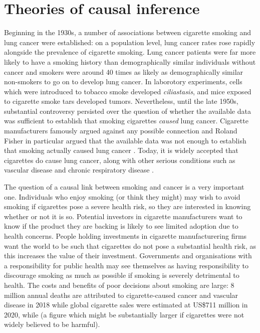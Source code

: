 

\section{Theories of causal inference}


Beginning in the 1930s, a number of associations between cigarette smoking and lung cancer were established: on a population level, lung cancer rates rose rapidly alongside the prevalence of cigarette smoking. Lung cancer patients were far more likely to have a smoking history than demographically similar individuals without cancer and smokers were around 40 times as likely as demographically similar non-smokers to go on to develop lung cancer. In laborotory experiments, cells which were introduced to tobacco smoke developed \emph{ciliastasis}, and mice exposed to cigarette smoke tars developed tumors\citep{proctor_history_2012}. Nevertheless, until the late 1950s, substantial controversy persisted over the question of whether the available data was sufficient to establish that smoking cigarettes \emph{caused} lung cancer. Cigarette manufacturers famously argued against any possible connection \citep{oreskes_merchants_2011} and Roland Fisher in particular argued that the available data was not enough to establish that smoking actually caused lung cancer \citep{fisher_cancer_1958}. Today, it is widely accepted that cigarettes do cause lung cancer, along with other serious conditions such as vascular disease and chronic respiratory disease \citep{world_health_organisation_tobacco_nodate,wiblin_why_2016}.

The question of a causal link between smoking and cancer is a very important one. Individuals who enjoy smoking (or think they might) may wish to avoid smoking if cigarettes pose a severe health risk, so they are interested in knowing whether or not it is so. Potential investors in cigarette manufacturers want to know if the product they are backing is likely to see limited adoption due to health concerns. People holding investments in cigarette manufacturering firms want the world to be such that cigarettes do not pose a substantial health risk, as this increases the value of their investment. Governments and organisations with a responsibility for public health may see themselves as having responsibility to discourage smoking as much as possible if smoking is severely detrimental to health. The costs and benefits of poor decisions about smoking are large: 8 million annual deaths are attributed to cigarette-caused cancer and vascular disease in 2018\citep{world_health_organisation_tobacco_nodate} while  global cigarette sales were estimated at US\$711 million in 2020, while \citep{noauthor_cigarettes_nodate} (a figure which might be substantially larger if cigarettes were not widely believed to be harmful).

